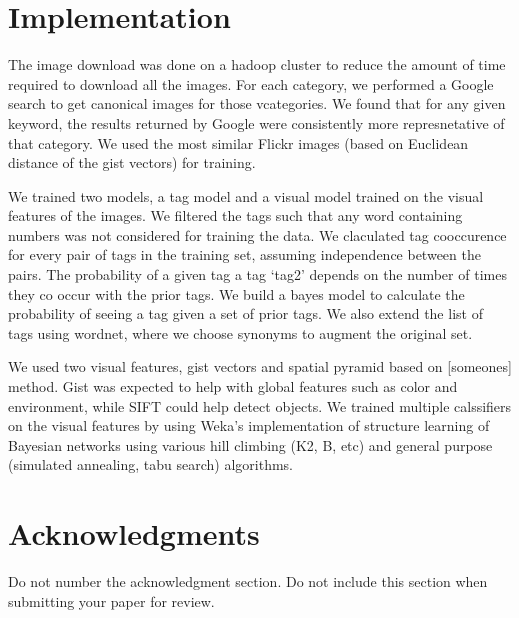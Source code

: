 \documentclass[12pt]{article}
\begin{document}
\section{Implementation}
The image download was done on a hadoop cluster to reduce the amount of time
required to download all the images.
For each category, we performed a Google search to get canonical images for
those vcategories. We found that for any given keyword, the results returned
by Google were consistently more represnetative of that category. We used the
most similar Flickr images (based on Euclidean distance of the gist vectors)
for training.

We trained two models, a tag model and a visual model trained on the visual
features of the images. We filtered the tags such that any word containing
numbers was not considered for training the data. We claculated tag
cooccurence for every pair of tags in the training set, assuming independence
between the pairs. The probability of a given tag  a tag `tag2' depends
on the number of times they co occur with the prior tags. We build a bayes model to calculate the
probability of seeing a tag given a set of prior tags. We also extend the list
of tags using wordnet, where we choose synonyms to augment the original set.

We used two visual features, gist vectors and spatial pyramid based on
[someones] method. Gist was expected to help with global features such as
color and environment, while SIFT could help detect objects. We trained multiple
calssifiers on the visual features by using Weka's implementation of structure
learning of Bayesian networks using various hill climbing (K2, B, etc) and
general purpose (simulated annealing, tabu search) algorithms.


\section*{Acknowledgments}

Do not number the acknowledgment section. Do not include this section
when submitting your paper for review.
%
%
\end{document}
